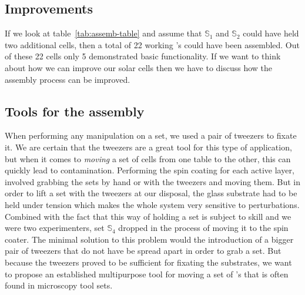 \documentclass[a4paper,10pt,twocolumn]{article}
\begin{document}
\begin{extract*}

\section{Improvements}\label{sec:improvements}
If we look at table~\ref{tab:assemb-table} and assume that $\mathbb{S}_1$ and $\mathbb{S}_2$ could have held two additional cells, then a total of 22 working \BHSC’s could have been assembled. Out of these 22 cells only 5 demonstrated basic functionality. If we want to think about how we can improve our solar cells then we have to discuss how the assembly process can be improved.

\subsection{Tools for the assembly}
When performing any manipulation on a set, we used a pair of tweezers to fixate it. We are certain that the tweezers are a great tool for this type of application, but when it comes to \emph{moving} a set of cells from one table to the other, this can quickly lead to contamination. Performing the spin coating for each active layer, involved grabbing the sets by hand or with the tweezers and moving them. But in order to lift a set with the tweezers at our disposal, the glass substrate had to be held under tension which makes the whole system very sensitive to perturbations. Combined with the fact that this way of holding a set is subject to skill and we were two experimenters, set $\mathbb{S}_4$ dropped in the process of moving it to the spin coater.\mypar
The minimal solution to this problem would the introduction of a bigger pair of tweezers that do not have be spread apart in order to grab a set. But because the tweezers proved to be sufficient for fixating the substrates, we want to propose an established multipurpose tool for moving a set of \BHSC's that is often found in microscopy tool sets.


\end{extract*}
\end{document}
